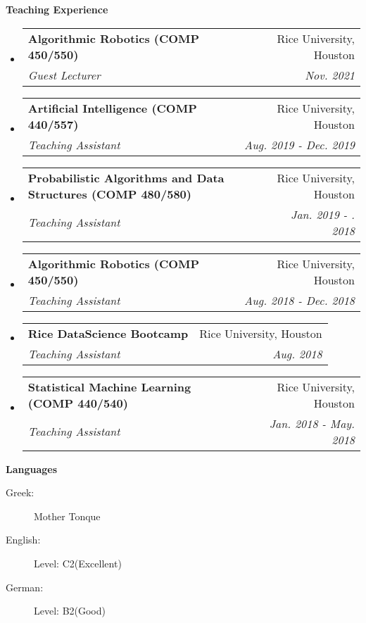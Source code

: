 \documentclass[letterpaper,11pt]{article}
\makeatletter
\newcommand{\resheading}[1]{{\large \colorbox{mygrey}{\begin{minipage}{\textwidth}{\textbf{#1 \vphantom{p\^{E}}}}\end{minipage}}}}
\newcommand{\ressubheading}[4]{
\begin{tabular*}{7.0in}{l@{\extracolsep{\fill}}r}
		\textbf{#1} & #2 \\
		\textit{#3} & \textit{#4} \\
\end{tabular*}\vspace{-6pt}}
\makeatother
\begin{document}
\resheading{Teaching Experience}
\begin{itemize}
	\item
	\ressubheading{Algorithmic Robotics (COMP  450/550) }
	{Rice University, Houston}{Guest Lecturer}
	{Nov. 2021}
	\item
	\ressubheading{Artificial Intelligence (COMP  440/557) }
	{Rice University, Houston}{Teaching Assistant}
	{Aug. 2019 - Dec. 2019}
	\item
	\ressubheading{Probabilistic Algorithms and Data Structures (COMP  480/580)}
	{Rice University, Houston}{Teaching Assistant}
	{Jan. 2019 - . 2018}
	\item
	\ressubheading{Algorithmic Robotics (COMP  450/550) }
	{Rice University, Houston}{Teaching Assistant}
	{Aug. 2018 - Dec. 2018}
	\item
	\ressubheading{Rice DataScience Bootcamp}
	{Rice University, Houston}{Teaching Assistant}
	{Aug. 2018}
	\item
	\ressubheading{Statistical Machine Learning (COMP 440/540)}
	{Rice University, Houston}{Teaching Assistant}
	{Jan. 2018 - May. 2018}
\end{itemize}

\resheading{Languages}
\begin{description}
	\item[Greek:] Mother Tonque 
	\item[English:] Level: C2(Excellent)
	\item[German:] Level: B2(Good)
\end{description}

	
\end{document}
